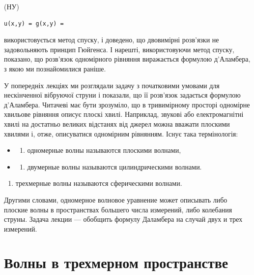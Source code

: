 \documentclass[
  ukrainian,
]{article}
\providecommand{\tightlist}{%
  \setlength{\itemsep}{0pt}\setlength{\parskip}{0pt}}
\begin{document}
(НУ)

\begin{verbatim}
u(x,y) = g(x,y) =
\end{verbatim}

використовується метод спуску, і доведено, що двовимірні розв'язки не
задовольняють принцип Гюйгенса. І нарешті, використовуючи метод спуску,
показано, що розв'язок одномірного рівняння виражається формулою
д'Аламбера, з якою ми познайомилися раніше.

У попередніх лекціях ми розглядали задачу з початковими умовами для
нескінченної вібруючої струни і показали, що її розв'язок задається
формулою д'Аламбера. Читачеві має бути зрозуміло, що в тривимірному
просторі одномірне хвильове рівняння описує плоскі хвилі. Наприклад,
звукові або електромагнітні хвилі на достатньо великих відстанях від
джерел можна вважати плоскими хвилями і, отже, описуватися одномірним
рівнянням. Існує така термінологія:

\begin{itemize}
\tightlist
\item
  \begin{enumerate}
  \def\labelenumi{\arabic{enumi})}
  \tightlist
  \item
    одномерные волны называются плоскими волнами,
  \end{enumerate}
\item
  \begin{enumerate}
  \def\labelenumi{\arabic{enumi})}
  \setcounter{enumi}{1}
  \tightlist
  \item
    двумерные волны называются цилиндрическими волнами.
  \end{enumerate}
\end{itemize}

\begin{enumerate}
\def\labelenumi{\arabic{enumi})}
\setcounter{enumi}{2}
\tightlist
\item
  трехмерные волны называются сферическими волнами.
\end{enumerate}

Другими словами, одномерное волновое уравнение может описывать либо
плоские волны в пространствах большего числа измерений, либо колебания
струны. Задача лекции --- обобщить формулу Даламбера на случай двух и
трех измерений.

\section{Волны в трехмерном
пространстве}\label{ux432ux43eux43bux43dux44b-ux432-ux442ux440ux435ux445ux43cux435ux440ux43dux43eux43c-ux43fux440ux43eux441ux442ux440ux430ux43dux441ux442ux432ux435}
\end{document}
